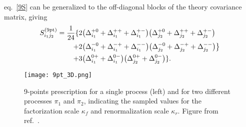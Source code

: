 eq.~\eqref{9S} can be generalized to the off-diagonal blocks of the theory covariance matrix, giving
\begin{equation}\label{9M}
\begin{split}
    S^{(\rm 9pt)}_{i_1j_2} =
    \frac{1}{24}\{&2\big(\Delta_{i_1}^{+0}+\Delta_{i_1}^{++}
    + \Delta_{i_1}^{+-}\big) \big(\Delta_{j_2}^{+0} +
    \Delta_{j_2}^{++} + \Delta_{j_2}^{+-} \big) \\ 
            + &2\big(\Delta_{i_1}^{-0} + \Delta_{i_1}^{-+} +
            \Delta_{i_1}^{--}\big)\big(\Delta_{j_2}^{-0} +
            \Delta_{j_2}^{-+} + \Delta_{j_2}^{--} \big) \big\}\\ 
            + &3\big(\Delta_{i_1}^{0+}+ \Delta_{i_1}^{0-}\big)\big(\Delta_{j_2}^{0+} + \Delta_{j_2}^{0-} \big)\}.
\end{split}            
\end{equation}

\begin{figure}[t]
    \centering
    {}
    \texttt{[image: 9pt\_3D.png]}
    \begin{caption}{9-points prescription for a single process (left) and for two different processes $\pi_1$
        and $\pi_2$, indicating
        the sampled values for the factorization scale $\kappa_f$ and 
        renormalization scale $\kappa_r$. Figure from ref.~\cite{AbdulKhalek:2019ihb}.
    \label{fig:symmetricPrescriptions}
      }
    \end{caption}
    \end{figure}

